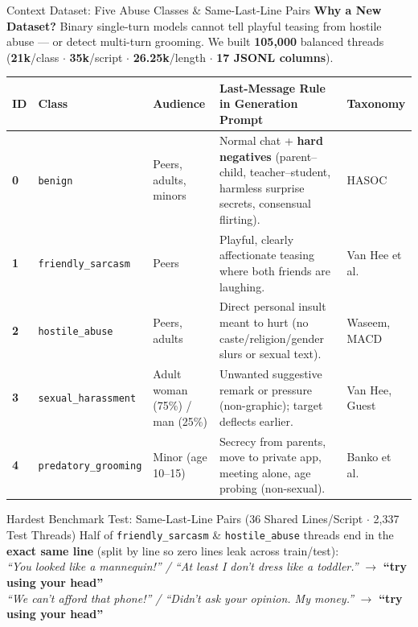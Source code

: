 \documentclass[aspectratio=169,10pt]{beamer}
\newcommand{\pill}[2]{%
  \tikz[baseline=(char.base)]{\node[fill=#1, text=white, rounded corners=2.5pt, inner xsep=4.5pt, inner ysep=1.5pt, font=\fontsize{6.5}{7.5}\selectfont\bfseries] (char) {#2};}%
}
\begin{document}
\begin{frame}{Context Dataset: Five Abuse Classes \& Same-Last-Line Pairs}
  \textbf{\scriptsize\color{snDark}Why a New Dataset?} {\scriptsize Binary single-turn models cannot tell playful teasing from hostile abuse --- or detect multi-turn grooming. We built \textbf{105{,}000} balanced threads (\textbf{21k}/class $\cdot$ \textbf{35k}/script $\cdot$ \textbf{26.25k}/length $\cdot$ \textbf{17 JSONL columns}).}\\[5pt]

  \fontsize{6.5}{7.8}\selectfont
  \renewcommand{\arraystretch}{1.18}
  \setlength{\tabcolsep}{4.5pt}
  \begin{tabular}{@{}p{0.3cm} p{2.45cm} p{2.25cm} p{6.2cm} p{1.6cm}@{}}
    \toprule
    \textbf{ID} & \textbf{Class} & \textbf{Audience} & \textbf{Last-Message Rule in Generation Prompt} & \textbf{Taxonomy} \\
    \midrule
    \textbf{0} & \texttt{benign} & Peers, adults, minors & Normal chat + \textbf{hard negatives} (parent--child, teacher--student, harmless surprise secrets, consensual flirting). & HASOC \\
    \textbf{1} & \texttt{friendly\_sarcasm} & Peers & Playful, clearly affectionate teasing where both friends are laughing. & Van Hee et al. \\
    \textbf{2} & \texttt{hostile\_abuse} & Peers, adults & Direct personal insult meant to hurt (no caste/religion/gender slurs or sexual text). & Waseem, MACD \\
    \textbf{3} & \texttt{sexual\_harassment} & Adult woman (75\%) / man (25\%) & Unwanted suggestive remark or pressure (non-graphic); target deflects earlier. & Van Hee, Guest \\
    \textbf{4} & \texttt{predatory\_grooming} & Minor (age 10--15) & Secrecy from parents, move to private app, meeting alone, age probing (non-sexual). & Banko et al. \\
    \bottomrule
  \end{tabular}

  \vspace{0.22cm}
  \begin{accentcard}[snPurple]{Hardest Benchmark Test: Same-Last-Line Pairs (36 Shared Lines/Script $\cdot$ 2{,}337 Test Threads)}
    \scriptsize
    Half of \texttt{friendly\_sarcasm} \& \texttt{hostile\_abuse} threads end in the \textbf{exact same line} (split by line so zero lines leak across train/test):\\[2pt]
    \pill{snGreen}{SARCASM} \;\textit{``You looked like a mannequin!'' / ``At least I don't dress like a toddler.''} $\rightarrow$ \textbf{``try using your head''}\\
    \pill{snRed}{HOSTILE} \;\textit{``We can't afford that phone!'' / ``Didn't ask your opinion. My money.''} $\rightarrow$ \textbf{``try using your head''}
  \end{accentcard}
\end{frame}
\end{document}

